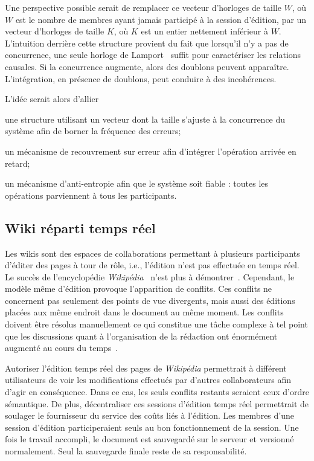 Une perspective possible serait de remplacer ce vecteur d'horloges de taille
$W$, où $W$ est le nombre de membres ayant jamais participé à la session
d'édition, par un vecteur d'horloges de taille $K$, où $K$ est un entier
nettement inférieur à $W$. L'intuition derrière cette structure provient du fait
que lorsqu'il n'y a pas de concurrence, une seule horloge de
Lamport~\cite{lamport1978time} suffit pour caractériser les relations
causales. Si la concurrence augmente, alors des doublons peuvent
apparaître. L'intégration, en présence de doublons, peut conduire à des
incohérences.

L'idée serait alors d'allier
\begin{inparaenum}[(i)]
\item une structure utilisant un vecteur dont la taille s'ajuste à la
  concurrence du système afin de borner la fréquence des erreurs;
\item un mécanisme de recouvrement sur erreur afin d'intégrer l'opération
  arrivée en retard;
\item un mécanisme d'anti-entropie afin que le système soit fiable : toutes les
  opérations parviennent à tous les participants.
\end{inparaenum}

\subsection{Wiki réparti temps réel}

Les wikis sont des espaces de collaborations permettant à plusieurs participants
d'éditer des pages à tour de rôle, i.e., l'édition n'est pas effectuée en temps
réel. Le succès de l'encyclopédie \emph{Wikipédia}~\cite{wikipedia} n'est plus à
démontrer~\cite{giles2005internet}. Cependant, le modèle même d'édition provoque
l'apparition de conflits. Ces conflits ne concernent pas seulement des points de
vue divergents, mais aussi des éditions placées aux même endroit dans le
document au même moment. Les conflits doivent être résolus manuellement ce qui
constitue une tâche complexe à tel point que les discussions quant à
l'organisation de la rédaction ont énormément augmenté au cours du
temps~\cite{kittur2007he}.

Autoriser l'édition temps réel des pages de \emph{Wikipédia} permettrait à
différent utilisateurs de voir les modifications effectués par d'autres
collaborateurs afin d'agir en conséquence. Dans ce cas, les seuls conflits
restants seraient ceux d'ordre sémantique.  De plus, décentraliser ces sessions
d'édition temps réel permettrait de soulager le fournisseur du service des coûts
liés à l'édition. Les membres d'une session d'édition participeraient seuls au
bon fonctionnement de la session. Une fois le travail accompli, le document est
sauvegardé sur le serveur et versionné normalement. Seul la sauvegarde finale
reste de sa responsabilité.

